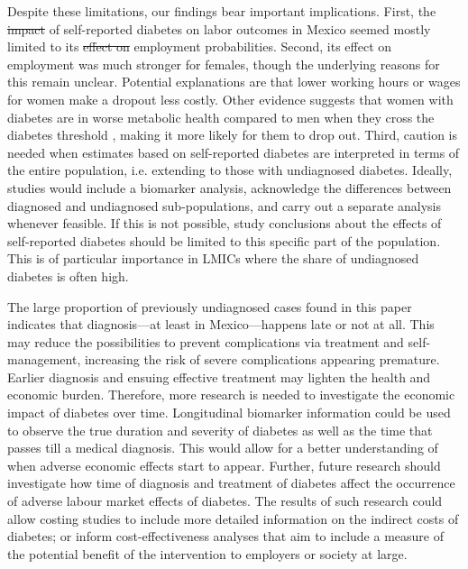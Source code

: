 \documentclass[12pt,english]{article}
\providecommand{\DIFaddtex}[1]{{\protect\color{blue}\uwave{#1}}} %
\providecommand{\DIFdeltex}[1]{{\protect\color{red}\sout{#1}}}                      %
\providecommand{\DIFaddbegin}{} %
\providecommand{\DIFaddend}{} %
\providecommand{\DIFdelbegin}{} %
\providecommand{\DIFdelend}{} %
\providecommand{\DIFadd}[1]{\texorpdfstring{\DIFaddtex{#1}}{#1}} %
\providecommand{\DIFdel}[1]{\texorpdfstring{\DIFdeltex{#1}}{}} %
\begin{document}
Despite these limitations, our findings bear important implications. First, the \DIFdelbegin \DIFdel{impact }\DIFdelend \DIFaddbegin \DIFadd{association }\DIFaddend of self-reported diabetes on labor outcomes in Mexico seemed mostly limited to its \DIFdelbegin \DIFdel{effect on }\DIFdelend \DIFaddbegin \DIFadd{relationship with lower }\DIFaddend employment probabilities.  Second, its effect on employment was much stronger for females, though the underlying reasons for this remain unclear. Potential explanations are that lower working hours or wages for women make a dropout less costly. Other evidence suggests that women with diabetes are in worse metabolic health compared to men when they cross the diabetes threshold \parencite{Peters2015}, making it more likely for them to drop out. Third, caution is needed when estimates based on self-reported diabetes are interpreted in terms of the entire population, i.e. extending to those with undiagnosed diabetes. Ideally, studies would include a biomarker analysis, acknowledge the differences between diagnosed and undiagnosed sub-populations, and carry out a separate analysis whenever feasible. If this is not possible, study conclusions about the effects of self-reported diabetes should be limited to this specific part of the population. This is of particular importance in \acp{LMIC} where the share of undiagnosed diabetes is often high.  

The large proportion of previously undiagnosed cases found in this paper indicates that diagnosis---at least in Mexico---happens late or not at all. This may reduce the possibilities to prevent complications via treatment and self-management, increasing the risk of severe complications appearing premature. Earlier diagnosis and ensuing effective treatment may lighten the health and economic burden. Therefore, more research is needed to investigate the economic impact of diabetes over time. Longitudinal biomarker information could be used to observe the true duration and severity of diabetes as well as the time that passes till a medical diagnosis. This would allow for a better understanding of when adverse economic effects start to appear. Further, future research should investigate how time of diagnosis and treatment of diabetes affect the occurrence of adverse labour market effects of diabetes. The results of such research could allow costing studies to include more detailed information on the indirect costs of diabetes; or inform cost-effectiveness analyses that aim to include a measure of the potential benefit of the intervention to employers or society at large. 
\end{document}
